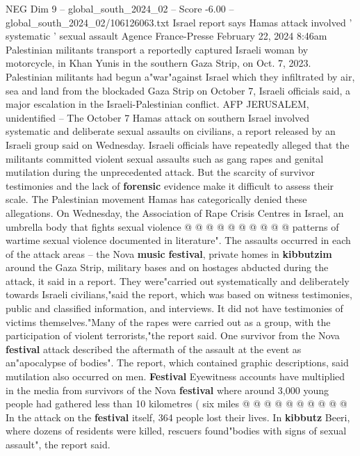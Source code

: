 \begin{textsample}{NEG Dim 9 – global\_south\_2024\_02 – Score -6.00 – global\_south\_2024\_02/106126063.txt}  \label{ex:f9_neg_343}
Israel report says Hamas attack involved ' systematic ' sexual assault Agence France-Presse February 22, 2024 8:46am Palestinian militants transport a reportedly captured Israeli woman by motorcycle, in Khan Yunis in the southern Gaza Strip, on Oct. 7, 2023.
Palestinian militants had begun a"war"against Israel which they infiltrated by air, sea and land from the blockaded Gaza Strip on October 7, Israeli officials said, a major escalation in the Israeli-Palestinian conflict.
AFP JERUSALEM, unidentified -- The October 7 Hamas attack on southern Israel involved systematic and deliberate sexual assaults on civilians, a report released by an Israeli group said on Wednesday.
Israeli officials have repeatedly alleged that the militants committed violent sexual assaults such as gang rapes and genital mutilation during the unprecedented attack.
But the scarcity of survivor testimonies and the lack of \textbf{forensic} evidence make it difficult to assess their scale.
The Palestinian movement Hamas has categorically denied these allegations.
On Wednesday, the Association of Rape Crisis Centres in Israel, an umbrella body that fights sexual violence @ @ @ @ @ @ @ @ @ @ patterns of wartime sexual violence documented in literature".
The assaults occurred in each of the attack areas -- the Nova \textbf{music} \textbf{festival}, private homes in \textbf{kibbutzim} around the Gaza Strip, military bases and on hostages abducted during the attack, it said in a report.
They were"carried out systematically and deliberately towards Israeli civilians,"said the report, which was based on witness testimonies, public and classified information, and interviews.
It did not have testimonies of victims themselves."Many of the rapes were carried out as a group, with the participation of violent terrorists,"the report said.
One survivor from the Nova \textbf{festival} attack described the aftermath of the assault at the event as an"apocalypse of bodies".
The report, which contained graphic descriptions, said mutilation also occurred on men. \textbf{Festival} Eyewitness accounts have multiplied in the media from survivors of the Nova \textbf{festival} where around 3,000 young people had gathered less than 10 kilometres ( six miles @ @ @ @ @ @ @ @ @ @ In the attack on the \textbf{festival} itself, 364 people lost their lives.
In \textbf{kibbutz} Beeri, where dozens of residents were killed, rescuers found"bodies with signs of sexual assault", the report said.

\end{textsample}
